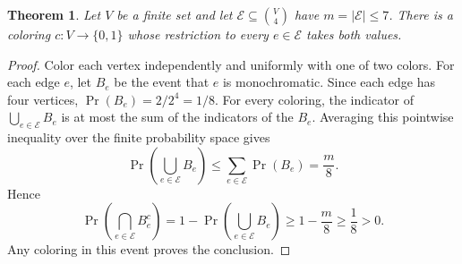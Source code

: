 \documentclass{article}
\newtheorem{theorem}{Theorem}
\begin{document}
\begin{theorem}\label{thm:target}
Let $V$ be a finite set and let $\mathcal E\subseteq\binom V4$ have
$m=|\mathcal E|\le 7$. There is a coloring $c:V\to\{0,1\}$ whose
restriction to every $e\in\mathcal E$ takes both values.
\end{theorem}
\begin{proof}
Color each vertex independently and uniformly with one of two colors.
For each edge $e$, let $B_e$ be the event that $e$ is monochromatic.
Since each edge has four vertices, $\Pr(B_e)=2/2^4=1/8$.
For every coloring, the indicator of $\bigcup_{e\in\mathcal E}B_e$
is at most the sum of the indicators of the $B_e$.
Averaging this pointwise inequality over the finite probability space gives
\[
 \Pr\!\left(\bigcup_{e\in\mathcal E}B_e\right)
 \le \sum_{e\in\mathcal E}\Pr(B_e)=\frac{m}{8}.
\]
Hence
\[
 \Pr\!\left(\bigcap_{e\in\mathcal E}B_e^c\right)
 =1-\Pr\!\left(\bigcup_{e\in\mathcal E}B_e\right)
 \ge 1-\frac{m}{8}\ge\frac18>0.
\]
Any coloring in this event proves the conclusion.
\end{proof}
\end{document}
